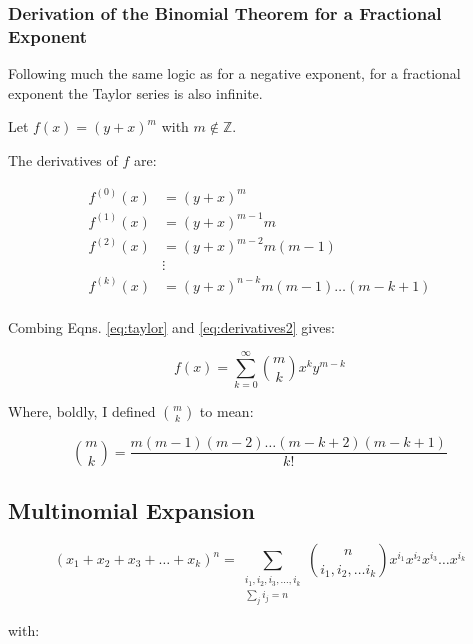 \subsubsection{Derivation of the Binomial Theorem for a Fractional Exponent}

Following much the same logic as for a negative exponent, for a fractional exponent the Taylor series is also infinite. 

Let $f(x) = (y+x)^{m}$ with $m\notin \mathbb{Z}$. 

The derivatives of $f$ are:

\begin{equation}
\begin{array}{ll}
f^{(0)}(x) &= (y+x)^{m}\\
f^{(1)}(x) &= (y+x)^{m-1}m\\
f^{(2)}(x) &= (y+x)^{m-2}m(m-1)\\
&\vdots\\
f^{(k)}(x) &= (y+x)^{n-k}m(m-1)\hdots	(m-k+1)\\
\end{array}
\label{eq:derivatives2}
\end{equation} 

Combing Eqns. \ref{eq:taylor} and \ref{eq:derivatives2} gives:

\begin{equation}
f(x) = \sum_{k=0}^\infty { m \choose k } x^k y^{m-k}
\end{equation}

Where, boldly, I defined ${ m \choose k}$ to mean:

\begin{equation}
{m \choose k} = \frac{m(m-1)(m-2)\hdots(m-k+2)(m-k+1)}{k!}
\end{equation}


\subsection{Multinomial Expansion}

\begin{equation}
(x_1 + x_2 + x_3 + \hdots + x_k)^n = \sum_{\begin{array}{c} i_1,i_2,i_3,\hdots,i_k \\ \sum_j i_j = n\end{array}} {n \choose i_1,i_2,\hdots i_k}x^{i_1}x^{i_2}x^{i_3}\hdots x^{i_k}
\end{equation}

with:

